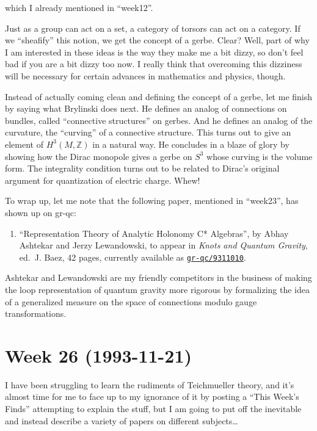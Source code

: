 \documentclass{article}
\def\tightlist{}
\begin{document}
which I already mentioned in ``week12''.

Just as a group can act on a set, a category of torsors can act on a
category. If we ``sheafify'' this notion, we get the concept of a gerbe.
Clear? Well, part of why I am interested in these ideas is the way they
make me a bit dizzy, so don't feel bad if you are a bit dizzy too now. I
really think that overcoming this dizziness will be necessary for
certain advances in mathematics and physics, though.

Instead of actually coming clean and defining the concept of a gerbe,
let me finish by saying what Brylinski does next. He defines an analog
of connections on bundles, called ``connective structures'' on gerbes.
And he defines an analog of the curvature, the ``curving'' of a
connective structure. This turns out to give an element of
\(H^3(M,\mathbb{Z})\) in a natural way. He concludes in a blaze of glory
by showing how the Dirac monopole gives a gerbe on \(S^3\) whose curving
is the volume form. The integrality condition turns out to be related to
Dirac's original argument for quantization of electric charge. Whew!

To wrap up, let me note that the following paper, mentioned in
``week23'', has shown up on gr-qc:

\begin{enumerate}
\def\labelenumi{\arabic{enumi})}
\setcounter{enumi}{5}
\tightlist
\item
  ``Representation Theory of Analytic Holonomy C* Algebras'', by Abhay
  Ashtekar and Jerzy Lewandowski, to appear in \emph{Knots and Quantum
  Gravity}, ed.~J. Baez, 42 pages, currently available as
  \href{http://xxx.lanl.gov/abs/gr-qc/9311010}{\texttt{gr-qc/9311010}}.
\end{enumerate}

Ashtekar and Lewandowski are my friendly competitors in the business of
making the loop representation of quantum gravity more rigorous by
formalizing the idea of a generalized measure on the space of
connections modulo gauge transformations.
\hypertarget{week-26-1993-11-21}{%
\section{Week 26 (1993-11-21)}\label{week-26-1993-11-21}}

I have been struggling to learn the rudiments of Teichmueller theory,
and it's almost time for me to face up to my ignorance of it by posting
a ``This Week's Finds'' attempting to explain the stuff, but I am going
to put off the inevitable and instead describe a variety of papers on
different subjects\ldots{}
\end{document}
